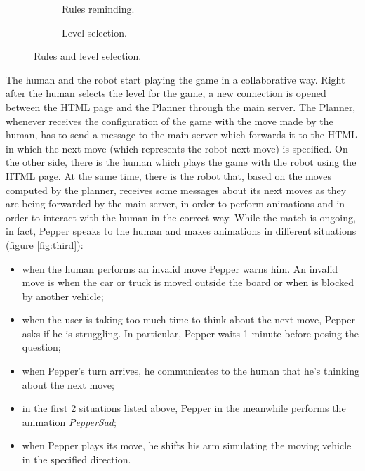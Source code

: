 \documentclass{article}
\begin{document}
\begin{figure}[H]
\begin{subfigure}{.5\textwidth}
      \caption{Rules reminding.}
    \end{subfigure}%
    \begin{subfigure}{.5\textwidth}
      \centering
      \caption{Level selection.}
    \end{subfigure}
    \caption{Rules and level selection.}
    \label{fig:second}
\end{figure}

The human and the robot start playing the game in a collaborative way. Right after the human selects the level for the game, a new connection is opened between the HTML page and the Planner through the main server. The Planner, whenever receives the configuration of the game with the move made by the human, has to send a message to the main server which forwards it to the HTML in which the next move (which represents the robot next move) is specified. On the other side, there is the human which plays the game with the robot using the HTML page. At the same time, there is the robot that, based on the moves computed by the planner, receives some messages about its next moves as they are being forwarded by the main server, in order to perform animations and in order to interact with the human in the correct way. While the match is ongoing, in fact, Pepper speaks to the human and makes animations in different situations (figure \ref{fig:third}): 
\begin{itemize}
    \item when the human performs an invalid move Pepper warns him. An invalid move is when the car or truck is moved outside the board or when is blocked by another vehicle;
    \item when the user is taking too much time to think about the next move, Pepper asks if he is struggling. In particular, Pepper waits 1 minute before posing the question;
    \item when Pepper's turn arrives, he communicates to the human that he's thinking about the next move;
    \item in the first 2 situations listed above, Pepper in the meanwhile performs the animation \textit{PepperSad};
    \item when Pepper plays its move, he shifts his arm simulating the moving vehicle in the specified direction.
\end{itemize}
\end{document}

